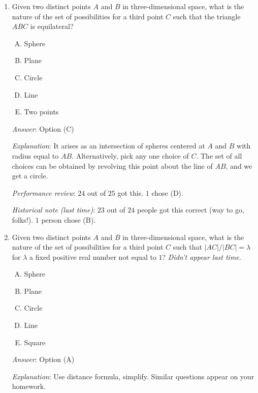 \documentclass[10pt]{amsart}
\begin{document}
\begin{enumerate}
  {\em Answer}: Option (C)

  {\em Explanation}: It arises as the intersection of spheres centered
  at $A$ and $B$ of radius equal to $|AB|/\sqrt{2}$.

  {\em Performance review}: $20$ out of $25$ got this. $4$ chose (E),
  $1$ chose (B).

\item Given two distinct points $A$ and $B$ in three-dimensional
  space, what is the nature of the set of possibilities for a third
  point $C$ such that the triangle $ABC$ is equilateral?

  \begin{enumerate}[(A)]
  \item Sphere
  \item Plane
  \item Circle
  \item Line
  \item Two points
  \end{enumerate}

  {\em Answer}: Option (C)

  {\em Explanation}: It arises as an intersection of spheres centered
  at $A$ and $B$ with radius equal to $AB$. Alternatively, pick any
  one choice of $C$. The set of all choices can be obtained by
  revolving this point about the line of $AB$, and we get a circle.

  {\em Performance review}: $24$ out of $25$ got this. $1$ chose (D).

  {\em Historical note (last time)}: $23$ out of $24$ people got this
  correct (way to go, folks!). $1$ person chose (B).

\item Given two distinct points $A$ and $B$ in three-dimensional
  space, what is the nature of the set of possibilities for a third
  point $C$ such that $|AC|/|BC| = \lambda$ for $\lambda$ a fixed
  positive real number not equal to $1$? {\em Didn't appear last time}.

  \begin{enumerate}[(A)]
  \item Sphere
  \item Plane
  \item Circle
  \item Line
  \item Square
  \end{enumerate}

  {\em Answer}: Option (A)

  {\em Explanation}: Use distance formula, simplify. Similar questions
  appear on your homework.


\end{enumerate}
\end{document}
